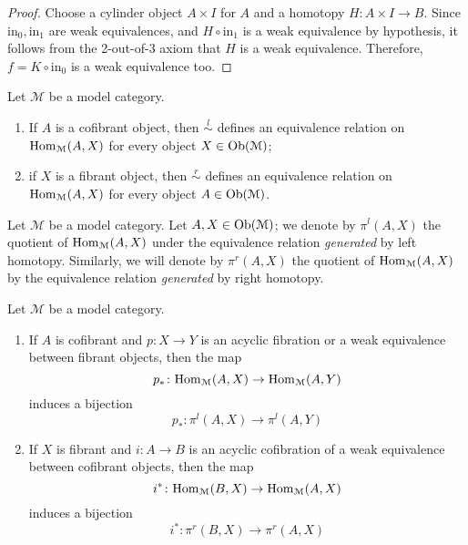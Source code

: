 \begin{refsection}
\begin{proof}
Choose a cylinder object $A \times I$ for $A$ and a homotopy $H \colon A \times I \to B$. Since $\mathrm{in}_0, \mathrm{in}_1$ are weak equivalences, and $H \circ \mathrm{in}_1$ is a weak equivalence by hypothesis, it follows from the 2-out-of-3 axiom that $H$ is a weak equivalence. Therefore, $f = K \circ \mathrm{in}_0$ is a weak equivalence too.
\end{proof}

\begin{lemma} \label{lemma homotopy category 1}
Let $\mathcal M$ be a model category.
\begin{enumerate}
\item If $A$ is a cofibrant object, then $\stackrel{l}{\sim}$ defines an equivalence relation on $\mathrm{Hom}_{\mathcal M}(A,X)$ for every object $X \in \operatorname{Ob}(\mathcal M)$;
\item if $X$ is a fibrant object, then $\stackrel{r}{\sim}$ defines an equivalence relation on $\mathrm{Hom}_{\mathcal M}(A,X)$ for every object $A \in \operatorname{Ob}(\mathcal M)$.
\end{enumerate}
\end{lemma}

\begin{defin}
Let $\mathcal M$ be a model category. Let $A,X \in \operatorname{Ob}(\mathcal M)$; we denote by $\pi^l(A,X)$ the quotient of $\mathrm{Hom}_{\mathcal M}(A,X)$ under the equivalence relation \emph{generated} by left homotopy. Similarly, we will denote by $\pi^r(A,X)$ the quotient of $\mathrm{Hom}_{\mathcal M}(A,X)$ by the equivalence relation \emph{generated} by right homotopy.
\end{defin}

\begin{lemma} \label{lemma homotopy category 2}
Let $\mathcal M$ be a model category.
\begin{enumerate}
\item If $A$ is cofibrant and $p \colon X \to Y$ is an acyclic fibration or a weak equivalence between fibrant objects, then the map
\[
p_* \colon \mathrm{Hom}_{\mathcal M}(A,X) \to \mathrm{Hom}_{\mathcal M}(A,Y)
\]
induces a bijection
\[
p_* \colon \pi^l(A,X) \to \pi^l(A,Y)
\]
\item If $X$ is fibrant and $i \colon A \to B$ is an acyclic cofibration of a weak equivalence between cofibrant objects, then the map
\[
i^* \colon \mathrm{Hom}_{\mathcal M}(B,X) \to \mathrm{Hom}_{\mathcal M}(A,X)
\]
induces a bijection
\[
i^* \colon \pi^r(B,X) \to \pi^r(A,X)
\]
\end{enumerate}
\end{lemma}


\end{refsection}
